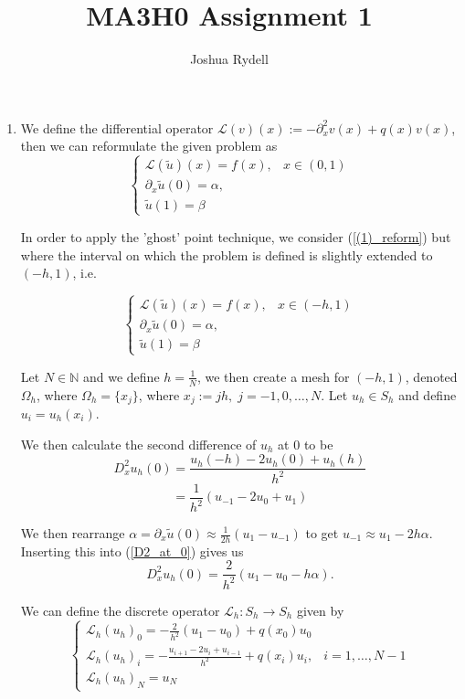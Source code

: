 \documentclass[a4paper,11pt]{article}
\title{MA3H0 Assignment 1}
\author{Joshua Rydell}
\theoremstyle{plain} %
\theoremstyle{definition} %
\theoremstyle{remark} %
\newcommand{\N}{\mathbb{N}}
\newcommand{\Lc}{\mathcal{L}}
\begin{document}
  
\maketitle
\begin{enumerate}
\item We define the differential operator $\Lc(v)(x) := -\partial^2_xv(x) + q(x)v(x)$, then we can reformulate the given problem as
\begin{equation} \label{(1)_reform}
\begin{cases}
\Lc(\tilde u)(x) = f(x), & x \in(0,1) \\
\partial_x \tilde u(0) = \alpha, \\
\tilde u(1) = \beta 
\end{cases} 
\end{equation} 

In order to apply the 'ghost' point technique, we consider (\ref{(1)_reform}) but where the interval on which the problem is defined is slightly extended to $(-h,1)$, i.e.

\begin{equation} \label{(1)_extended}
\begin{cases}
\Lc(\tilde u)(x) = f(x), & x \in(-h,1) \\
\partial_x \tilde u(0) = \alpha, \\
\tilde u(1) = \beta 
\end{cases} 
\end{equation} 

Let $N \in \N$ and we define $h = \frac 1 N$, we then create a mesh for $(-h,1)$, denoted $\Omega_h$, where $\Omega_h = \{x_j\}$, where $x_j := jh, \; j = -1, 0, \dotsc, N$. Let $u_h \in S_h$ and define $u_i = u_h(x_i)$.

We then calculate the second difference of $u_h$ at 0 to be 
 \[D^2_x u_h(0) = \frac{ u_h(-h)-2  u_h(0)+ u_h(h)}{h^2}\] 
\begin{equation} \label{D2_at_0}
= \frac{1}{h^2}(u_{-1}-2  u_0+  u_1)
\end{equation} 

We then rearrange $\alpha = \partial_x \tilde u(0) \approx \frac{1}{2h}(u_1 - u_{-1})$ to get $u_{-1} \approx u_1 -2h\alpha$. Inserting this into (\ref{D2_at_0}) gives us 
\[D^2_x u_h(0) = \frac{2}{h^2}(u_1 - u_0 - h\alpha).\]

We can define the discrete operator $\Lc_h : S_h \to S_h$ given by
\begin{equation} \label{def_of_Lh}
\begin{cases}
\Lc_h(u_h)_0 = -\frac{2}{h^2}(u_1-u_0) +q(x_0)u_0  \\
\Lc_h(u_h)_i = -\frac{u_{i+1}-2u_i+u_{i-1}}{h^2} + q(x_i)u_i, & i = 1, \dotsc, N-1 \\
\Lc_h(u_h)_N = u_N 
\end{cases} 
\end{equation} 


\end{enumerate}
\end{document}
